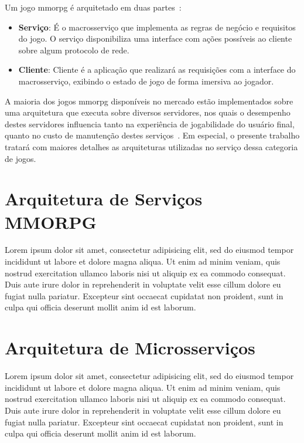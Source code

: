 Um jogo \ac{mmorpg} é arquitetado em duas partes~\cite{mmo_analytic}:
\begin{itemize}
  \item \textbf{Serviço}: É o macrosserviço que implementa as regras de negócio e requisitos do jogo.
  O serviço disponibiliza uma interface com ações possíveis ao cliente sobre algum protocolo de rede.
  \item \textbf{Cliente}: Cliente é a aplicação que realizará as requisições com a interface do macrosserviço, exibindo o estado de jogo de forma imersiva ao jogador.
\end{itemize}

A maioria dos jogos \ac{mmorpg} disponíveis no mercado estão implementados sobre uma arquitetura que executa sobre diversos servidores\cite{stephenclarkewillson2017}, nos quais o desempenho destes servidores influencia tanto na experiência de jogabilidade do usuário final, quanto no custo de manutenção destes serviços~\cite{1417630}.
%
Em especial, o presente trabalho tratará com maiores detalhes as arquiteturas utilizadas no serviço dessa categoria de jogos.


\section{Arquitetura de Serviços MMORPG}

Lorem ipsum dolor sit amet, consectetur adipisicing elit, sed do eiusmod tempor incididunt ut labore et dolore magna aliqua. Ut enim ad minim veniam, quis nostrud exercitation ullamco laboris nisi ut aliquip ex ea commodo consequat. Duis aute irure dolor in reprehenderit in voluptate velit esse cillum dolore eu fugiat nulla pariatur. Excepteur sint occaecat cupidatat non proident, sunt in culpa qui officia deserunt mollit anim id est laborum.

\section{Arquitetura de Microsserviços}

Lorem ipsum dolor sit amet, consectetur adipisicing elit, sed do eiusmod tempor incididunt ut labore et dolore magna aliqua. Ut enim ad minim veniam, quis nostrud exercitation ullamco laboris nisi ut aliquip ex ea commodo consequat. Duis aute irure dolor in reprehenderit in voluptate velit esse cillum dolore eu fugiat nulla pariatur. Excepteur sint occaecat cupidatat non proident, sunt in culpa qui officia deserunt mollit anim id est laborum.


